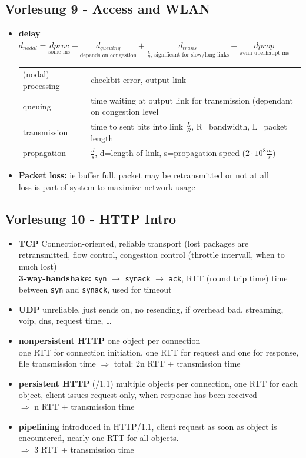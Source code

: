 \subsection*{Vorlesung 9 - Access and WLAN}
 \begin{itemize}
  \item \textbf{delay} $d_{nodal}=\underset{\text{some ms}}{d{proc}}+\underset{\text{depends on congestion}}{d_{queuing}}+\underset{\frac{L}{R}\text{, significant for slow/long links}}{d_{trans}}+\underset{\text{wenn überhaupt ms}}{d{prop}} $\\
   \begin{tabular}{|ll|}
    \hline
     (nodal) processing & checkbit error, output link \\
     queuing & time waiting at output link for transmission (dependant on congestion level \\
     transmission & time to sent bits into link $\frac{L}{R}$, R=bandwidth, L=packet length \\
     propagation & $\frac{d}{s}$, d=length of link, s=propagation speed ($2\cdot 10^8 \frac{m}{s})$ \\
    \hline
   \end{tabular}
  \item \textbf{Packet loss:} ie buffer full, packet may be retransmitted or not at all \\
  loss is part of system to maximize network usage
 \end{itemize}
 
\subsection*{Vorlesung 10 - HTTP Intro}
 \begin{itemize}
  \item \textbf{TCP} Connection-oriented, reliable transport (lost packages are retransmitted, flow control, congestion control (throttle intervall, when to much lost)\\
  \textbf{3-way-handshake:} \texttt{syn} $\to$ \texttt{synack} $\to$ \texttt{ack}, RTT (round trip time) time between \texttt{syn} and \texttt{synack}, used for timeout
  \item \textbf{UDP} unreliable, just sends on, no resending, if overhead bad, streaming, voip, dns, request time, \dots
  \item \textbf{nonpersistent HTTP} one object per connection \\
  one RTT for connection initiation, one RTT for request and one for response, file transmission time $\Rightarrow$ total: 2n RTT + transmission time
  \item \textbf{persistent HTTP} (/1.1) multiple objects per connection, one RTT for each object, client issues request only, when response has been received \\
  $\Rightarrow$ n RTT + transmission time
  \item \textbf{pipelining} introduced in HTTP/1.1, client request as soon as object is encountered, nearly one RTT for all objects. \\
  $\Rightarrow$ 3 RTT + transmission time
 \end{itemize}
 
